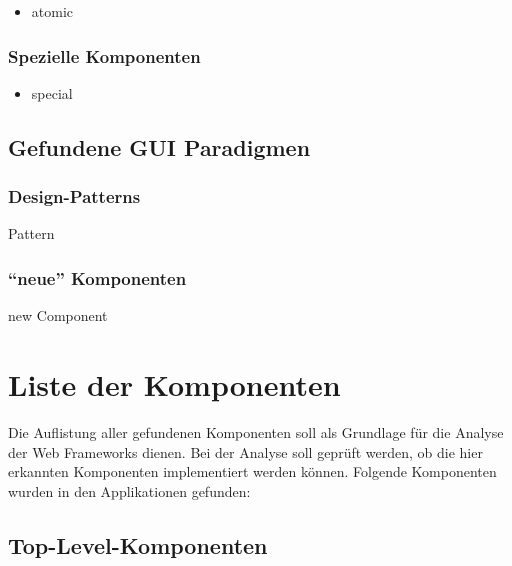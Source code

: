  \begin{itemize}
    \item atomic
  \end{itemize}
  
  \subsubsection{Spezielle Komponenten}
    
  \begin{itemize}
    \item special
  \end{itemize}
  
  \subsection{Gefundene GUI Paradigmen}
    
  \subsubsection{Design-Patterns}
  
  \begin{description}
    \item[Pattern]
  \end{description}
  
  \subsubsection{``neue'' Komponenten}
  
  \begin{description}
    \item[new Component]
  \end{description}
  
  \section{Liste der Komponenten}
  
  Die Auflistung aller gefundenen Komponenten soll als Grundlage für die Analyse
  der Web Frameworks dienen. Bei der Analyse soll geprüft werden, ob die hier
  erkannten Komponenten implementiert werden können. Folgende Komponenten
  wurden in den Applikationen gefunden:
  
  \subsection{Top-Level-Komponenten}
  
